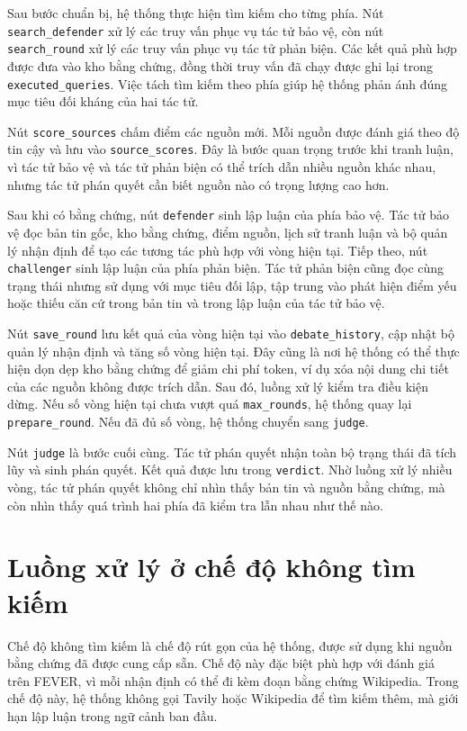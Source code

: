 ﻿\documentclass[oneside,a4paper,12pt]{extreport}
\begin{document}
Sau bước chuẩn bị, hệ thống thực hiện tìm kiếm cho từng phía. Nút \texttt{search\_defender} xử lý các truy vấn phục vụ tác tử bảo vệ, còn nút \texttt{search\_round} xử lý các truy vấn phục vụ tác tử phản biện. Các kết quả phù hợp được đưa vào kho bằng chứng, đồng thời truy vấn đã chạy được ghi lại trong \texttt{executed\_queries}. Việc tách tìm kiếm theo phía giúp hệ thống phản ánh đúng mục tiêu đối kháng của hai tác tử.

Nút \texttt{score\_sources} chấm điểm các nguồn mới. Mỗi nguồn được đánh giá theo độ tin cậy và lưu vào \texttt{source\_scores}. Đây là bước quan trọng trước khi tranh luận, vì tác tử bảo vệ và tác tử phản biện có thể trích dẫn nhiều nguồn khác nhau, nhưng tác tử phán quyết cần biết nguồn nào có trọng lượng cao hơn.

Sau khi có bằng chứng, nút \texttt{defender} sinh lập luận của phía bảo vệ. Tác tử bảo vệ đọc bản tin gốc, kho bằng chứng, điểm nguồn, lịch sử tranh luận và bộ quản lý nhận định để tạo các tương tác phù hợp với vòng hiện tại. Tiếp theo, nút \texttt{challenger} sinh lập luận của phía phản biện. Tác tử phản biện cũng đọc cùng trạng thái nhưng sử dụng với mục tiêu đối lập, tập trung vào phát hiện điểm yếu hoặc thiếu căn cứ trong bản tin và trong lập luận của tác tử bảo vệ.

Nút \texttt{save\_round} lưu kết quả của vòng hiện tại vào \texttt{debate\_history}, cập nhật bộ quản lý nhận định và tăng số vòng hiện tại. Đây cũng là nơi hệ thống có thể thực hiện dọn dẹp kho bằng chứng để giảm chi phí token, ví dụ xóa nội dung chi tiết của các nguồn không được trích dẫn. Sau đó, luồng xử lý kiểm tra điều kiện dừng. Nếu số vòng hiện tại chưa vượt quá \texttt{max\_rounds}, hệ thống quay lại \texttt{prepare\_round}. Nếu đã đủ số vòng, hệ thống chuyển sang \texttt{judge}.

Nút \texttt{judge} là bước cuối cùng. Tác tử phán quyết nhận toàn bộ trạng thái đã tích lũy và sinh phán quyết. Kết quả được lưu trong \texttt{verdict}. Nhờ luồng xử lý nhiều vòng, tác tử phán quyết không chỉ nhìn thấy bản tin và nguồn bằng chứng, mà còn nhìn thấy quá trình hai phía đã kiểm tra lẫn nhau như thế nào.

\section{Luồng xử lý ở chế độ không tìm kiếm}

Chế độ không tìm kiếm là chế độ rút gọn của hệ thống, được sử dụng khi nguồn bằng chứng đã được cung cấp sẵn. Chế độ này đặc biệt phù hợp với đánh giá trên FEVER, vì mỗi nhận định có thể đi kèm đoạn bằng chứng Wikipedia. Trong chế độ này, hệ thống không gọi Tavily hoặc Wikipedia để tìm kiếm thêm, mà giới hạn lập luận trong ngữ cảnh ban đầu.
\end{document}
